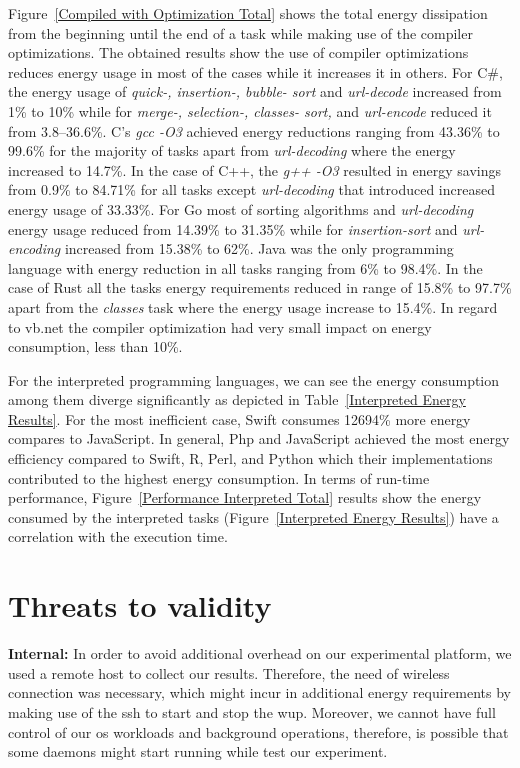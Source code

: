 Figure~\ref{Compiled with Optimization Total} shows the total 
energy dissipation from the beginning until the end of a task 
while making use of the compiler optimizations.
The obtained results show the use of compiler optimizations 
reduces energy usage in most of the cases while it increases 
it in others. 
For C\#, the energy usage of \textit{quick-, 
	insertion-, bubble- sort} and \textit{url-decode} increased from 
1\% to 10\% while for \textit{merge-, selection-, classes- sort,} and 
\textit{url-encode} reduced it from 3.8--36.6\%. 
C's \textit{gcc -O3} achieved energy reductions ranging from 43.36\% 
to 99.6\% for the majority of tasks apart from \textit{url-decoding} 
where the energy increased to 14.7\%.
In the case of C++, the \textit{g++ -O3} resulted in energy savings 
from 0.9\% to 84.71\% for all tasks except \textit{url-decoding} 
that introduced increased energy usage of 33.33\%.
For Go most of sorting algorithms and \textit{url-decoding} energy 
usage reduced from 14.39\% to 31.35\% while for \textit{insertion-sort} 
and \textit{url-encoding} increased from 15.38\% to 62\%. 
Java was the only programming language with energy reduction in 
all tasks ranging from 6\% to 98.4\%.
In the case of Rust all the tasks energy requirements reduced in 
range of 15.8\% to 97.7\% apart from the \textit{classes} task 
where the energy usage increase to 15.4\%. 
In regard to {\sc vb.net} the compiler optimization had very small 
impact on energy consumption, less than 10\%.


For the interpreted programming languages, we can see the energy 
consumption among them diverge significantly as depicted in 
Table~\ref{Interpreted Energy Results}. 
For the most inefficient case, Swift consumes 12694\% more energy 
compares to JavaScript. 
In general, Php and JavaScript achieved the most energy efficiency 
compared to Swift, R, Perl, and Python which their implementations 
contributed to the highest energy consumption. 
In terms of run-time performance, Figure~\ref{Performance Interpreted Total} 
results show the energy consumed by the interpreted tasks (Figure~\ref{Interpreted Energy Results}) 
have a correlation with the execution time.


\section{Threats to validity} \label{threats_of_validity}
\noindent\textbf{Internal:} In order to avoid additional overhead 
on our experimental platform, we used a remote host to collect our 
results. 
Therefore, the need of wireless connection was necessary, which 
might incur in additional energy requirements by making use of 
the {\sc ssh} to start and stop the {\sc wup}. 
Moreover, we cannot have full control of our {\sc os} workloads 
and background operations, therefore, is possible that some 
daemons might start running while test our experiment. 

